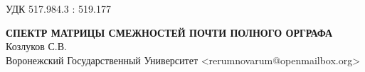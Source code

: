 \documentclass[11pt]{article}
\begin{document}
\setcounter{thm}{0}
\small УДК 517.984.3 : 519.177

\begin{center}
\textbf{СПЕКТР МАТРИЦЫ СМЕЖНОСТЕЙ ПОЧТИ ПОЛНОГО ОРГРАФА}\\
\small{Козлуков С.В.} \\
\small{Воронежский Государственный Университет}
\small{<rerumnovarum@openmailbox.org>} \\
\end{center}



\end{document}
